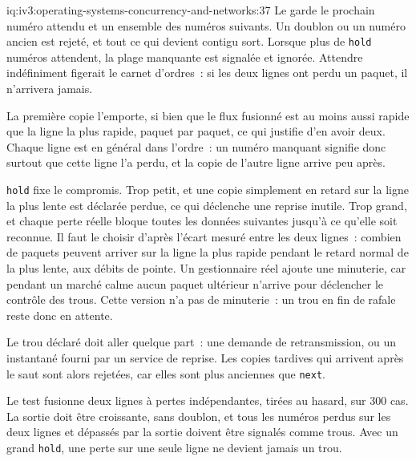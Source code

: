 \begin{solution}{iq:iv3:operating-systems-concurrency-and-networks:37}
Le  garde le prochain numéro attendu et un ensemble des numéros suivants. Un doublon ou un numéro ancien est rejeté, et tout ce qui devient contigu sort. Lorsque plus de \texttt{hold} numéros attendent, la plage manquante est signalée et ignorée. Attendre indéfiniment figerait le carnet d'ordres~: si les deux lignes ont perdu un paquet, il n'arrivera jamais.
\label{lst:iv3:os:arb}

La première copie l'emporte, si bien que le flux fusionné est au moins aussi rapide que la ligne la plus rapide, paquet par paquet, ce qui justifie d'en avoir deux. Chaque ligne est en général dans l'ordre~: un numéro manquant signifie donc surtout que cette ligne l'a perdu, et la copie de l'autre ligne arrive peu après.

\texttt{hold} fixe le compromis. Trop petit, et une copie simplement en retard sur la ligne la plus lente est déclarée perdue, ce qui déclenche une reprise inutile. Trop grand, et chaque perte réelle bloque toutes les données suivantes jusqu'à ce qu'elle soit reconnue. Il faut le choisir d'après l'écart mesuré entre les deux lignes~: combien de paquets peuvent arriver sur la ligne la plus rapide pendant le retard normal de la plus lente, aux débits de pointe. Un gestionnaire réel ajoute une minuterie, car pendant un marché calme aucun paquet ultérieur n'arrive pour déclencher le contrôle des trous. Cette version n'a pas de minuterie~: un trou en fin de rafale reste donc en attente.

Le trou déclaré doit aller quelque part~: une demande de retransmission, ou un instantané fourni par un service de reprise. Les copies tardives qui arrivent après le saut sont alors rejetées, car elles sont plus anciennes que \texttt{next}.

Le test fusionne deux lignes à pertes indépendantes, tirées au hasard, sur 300 cas. La sortie doit être croissante, sans doublon, et tous les numéros perdus sur les deux lignes et dépassés par la sortie doivent être signalés comme trous. Avec un grand \texttt{hold}, une perte sur une seule ligne ne devient jamais un trou.

\end{solution}

